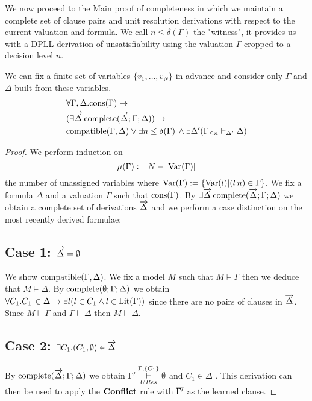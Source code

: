 We now proceed to the Main proof of completeness in which we maintain a complete set of clause pairs and unit resolution derivations with respect to the current valuation and formula. We call $n \leq \delta(\Gamma)$  the "witness", it provides us with a DPLL derivation of unsatisfiability using the valuation $\Gamma$ cropped to a decision level $n$.\\
\medskip
\begin{mytheorem}\label{thm:moddpllcompleteness} 
We can fix a finite set of variables $\{v_1, \ldots , v_N \}$ in advance and consider only $\Gamma$ and $\Delta$ built from these variables.
\begin{align*}
 &\forall \Gamma, \Delta. \mathrm{cons}(\Gamma) \to   \\ 
& (\exists \overrightarrow{\Delta} \, \mathrm{complete}(\overrightarrow{\Delta};\Gamma; \Delta)) \to \\
&\mathrm{compatible}(\Gamma,\Delta) \vee  \exists n \leq \delta(\Gamma) \, \wedge  \exists \Delta' ( \Gamma_{\leq n}  \vdash_{\Delta'} \Delta)
\end{align*}
%
\begin{proof}
We perform induction on  
$$\mu(\Gamma) := N - |\mathrm{Var}(\Gamma)|$$
the number of unassigned variables where $\mathrm{Var}(\Gamma) := \{\mathrm{Var}(l)| (l \, n) \in \Gamma \}$.
%
We fix a formula $\Delta$ and a valuation $\Gamma$ such that $\mathrm{cons}(\Gamma)$. By $\exists \overrightarrow{\Delta} \, \mathrm{complete}(\overrightarrow{\Delta};\Gamma; \Delta) $ we obtain a complete set of derivations $\overrightarrow{\Delta}$ and we perform a case distinction on the most recently derived formulae:

\subsection*{Case 1: $\overrightarrow{\Delta} = \emptyset$}
We show $\mathrm{compatible}(\Gamma,\Delta)$. We fix a model $M$ such that $M \models \Gamma$ then we  deduce that $M \models \Delta$. By $\mathrm{complete}(\emptyset;\Gamma; \Delta)$ we obtain $\forall C_1. C_1 \, \in \Delta \to \exists l( l \in C_1 \wedge l \in \mathrm{Lit}(\Gamma))$ since there are no pairs of clauses in $\overrightarrow{\Delta}$. Since $M \models \Gamma$ and $\Gamma \models \Delta$ then $M \models \Delta$.

\subsection*{Case 2: $\exists C_1. (C_1, \emptyset) \in \overrightarrow{\Delta}$}
By $\mathrm{complete}(\overrightarrow{\Delta};\Gamma; \Delta)$ we obtain $\Gamma' \overset{\Gamma;\{ C_1 \} }{\underset{URes}{\vdash}} \emptyset$ and $C_1 \in \Delta$ . This derivation can then be used to apply the $\mathbf{Conflict}$ rule with $\overline{\Gamma'}$ as the learned clause. 
%

\end{proof}
\end{mytheorem}

